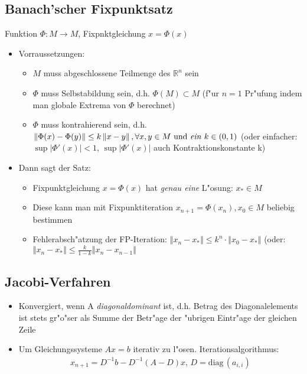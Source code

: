 \documentclass[fleqn,12pt]{scrartcl}
\newcommand{\abs}[1]{
	\left \vert #1 \right \vert
}
\newcommand{\absbb}[1]{
	\left \Vert #1 \right \Vert
}
\begin{document}
\subsection{Banach'scher Fixpunktsatz}
Funktion $\Phi: M \rightarrow M$, Fixpnktgleichung $x = \Phi(x)$ 
\begin{itemize}
	\item
		Vorraussetzungen:
		\begin{itemize}
			\item
				$M$ muss abgeschlossene Teilmenge des $\mathbb{R}^n$ sein
			\item
				$\Phi$ muss Selbstabildung sein, d.h. $\Phi(M) \subset M$ (f"ur $n = 1$ Pr"ufung indem man globale Extrema von $\Phi$ berechnet)
			\item
				$\Phi$ muss kontrahierend sein, d.h. $\absbb{\Phi(x) - \Phi(y)} \leq k\absbb{x-y}, \forall x,y \in M \text{ und \emph{ein} }k \in (0,1)$ (oder einfacher: $\sup\abs{\Phi'(x)} < 1$, $\sup\abs{\Phi'(x)}$ auch Kontraktionskonstante k)

		\end{itemize}
	\item Dann sagt der Satz:
		\begin{itemize}
			\item
				Fixpunktgleichung $x = \Phi(x)$ hat \emph{genau eine} L"osung: $x_* \in M$
			\item
				Diese kann man mit Fixpunktiteration $x_{n+1} = \Phi(x_n), x_0 \in M$ beliebig bestimmen
			\item Fehlerabsch"atzung der FP-Iteration: $\absbb{x_n - x_*} \leq k^n\cdot \absbb{x_0 - x_*}$ (oder: $\absbb{x_n - x_*} \leq \frac{k}{1-k}\absbb{x_n - x_{n-1}}$
		\end{itemize}
\end{itemize}

\subsection{Jacobi-Verfahren}
\begin{itemize}
	\item
		Konvergiert, wenn A \emph{diagonaldominant} ist, d.h. Betrag des Diagonalelements ist stets gr"o"ser als Summe der Betr"age der "ubrigen Eintr"age der gleichen Zeile
	\item
		Um Gleichungssysteme $Ax = b$ iterativ zu l"osen. Iterationsalgorithmus:
		\begin{align*}
			x_{n+1} = D^{-1}b-D^{-1}(A-D)x, \, D = \text{diag}\, (a_{i,i})
		\end{align*}
\end{itemize}
\end{document}
